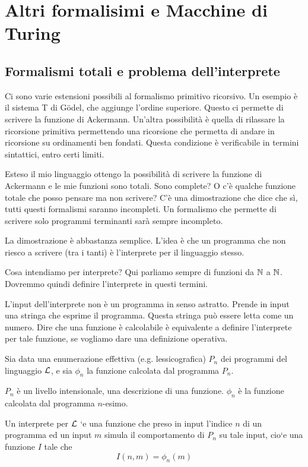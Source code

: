 \chapter{Altri formalisimi e Macchine di Turing}

\section{Formalismi totali e problema dell'interprete}

Ci sono varie estensioni possibili al formalismo primitivo ricorsivo. Un esempio è il sistema T di
Gödel, che aggiunge l'ordine superiore. Questo ci permette di scrivere la funzione di Ackermann.
Un'altra possibilità è quella di rilassare la ricorsione primitiva permettendo una ricorsione che
permetta di andare in ricorsione su ordinamenti ben fondati. Questa condizione è verificabile in
termini sintattici, entro certi limiti.

Esteso il mio linguaggio ottengo la possibilità di scrivere la funzione di Ackermann e le mie
funzioni sono totali. Sono complete? O c'è qualche funzione totale che posso pensare ma non
scrivere? C'è una dimostrazione che dice che sì, tutti questi formalismi saranno incompleti. Un
formalismo che permette di scrivere solo programmi terminanti sarà sempre incompleto.

La dimostrazione è abbastanza semplice. L'idea è che un programma che non riesco a scrivere (tra
i tanti) è l'interprete per il linguaggio stesso. 

Cosa intendiamo per interprete? Qui parliamo sempre di funzioni da $\mathbb{N}$ a $\mathbb{N}$. Dovremmo quindi
definire l'interprete in questi termini.

L'input dell'interprete non è un programma in senso astratto. Prende in input una stringa che
esprime il programma. Questa stringa può essere letta come un numero. Dire che una funzione è
calcolabile è equivalente a definire l'interprete per tale funzione, se vogliamo dare una
definizione operativa.

Sia data una enumerazione effettiva (e.g. lessicografica) $P_{n}$ dei programmi del
linguaggio $\mathcal{L}$, e sia $\phi_{n}$ la funzione calcolata dal programma $P_{n}$.

$P_{n}$ è un livello intensionale, una descrizione di una funzione. $\phi_{n}$ è la funzione
calcolata dal programma $n$-esimo.

Un interprete per $\mathcal{L}$ `e una funzione che preso in input l'indice $n$ di un programma ed un
input $m$ simula il comportamento di $P_{n}$ su tale input, cio`e una funzione $I$ tale che
\begin{equation*}
    I (n, m) = \phi_{n}(m)
\end{equation*}

